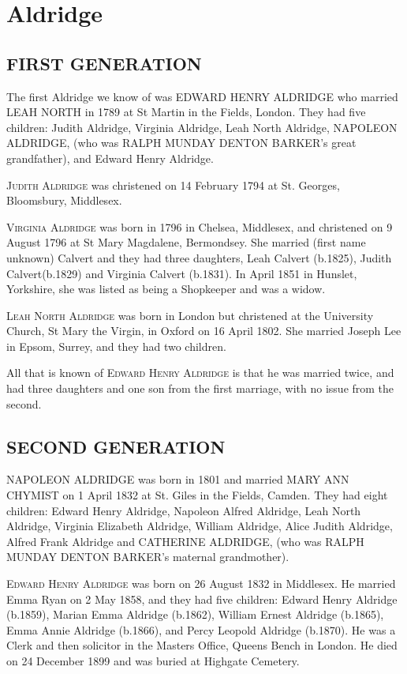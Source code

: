 \section{Aldridge}

\subsection{FIRST GENERATION}

The first Aldridge we know of was \uppercase{Edward Henry Aldridge} who married \uppercase{Leah North} in 1789 at St Martin in the Fields, London. They had five children: Judith Aldridge, Virginia Aldridge, Leah North Aldridge, \uppercase{Napoleon Aldridge}, (who was \uppercase{Ralph Munday Denton Barker}'s great grandfather), and Edward Henry Aldridge. 

\textsc{Judith Aldridge} was christened on 14 February 1794 at St. Georges,	Bloomsbury, Middlesex.

\textsc{Virginia Aldridge} was born in 1796 in Chelsea, Middlesex, and christened on 9 August 1796 at St Mary Magdalene,  	Bermondsey. She married  (first name unknown) Calvert and they had three daughters, Leah Calvert (b.1825), Judith Calvert(b.1829) and Virginia Calvert (b.1831). In April 1851 in	Hunslet, Yorkshire, she was listed as being a Shopkeeper and was a widow.

\textsc{Leah North Aldridge} was born in London but christened at the University Church, St Mary the Virgin, in Oxford on 16 April 1802. She married Joseph Lee in Epsom, Surrey, and they had two children.

All that is known of \textsc{Edward Henry Aldridge} is that he was married twice, and had three daughters and one son from the first marriage,  with no issue from the second. 

\subsection{SECOND GENERATION}

\uppercase{Napoleon Aldridge} was born in 1801 and married \uppercase{Mary Ann Chymist} on 1 April 1832 at St. Giles in the Fields, Camden.  They had eight children: Edward Henry Aldridge, Napoleon Alfred Aldridge, Leah North Aldridge, Virginia Elizabeth Aldridge, William Aldridge, Alice Judith Aldridge, Alfred Frank Aldridge and \uppercase{Catherine Aldridge}, (who was \uppercase{Ralph Munday Denton Barker}'s maternal grandmother).

\textsc{Edward Henry Aldridge} was born on 26 August 1832 in Middlesex. He married Emma Ryan on 2 May 1858, and they had five children: Edward Henry Aldridge (b.1859), Marian Emma Aldridge (b.1862), William Ernest Aldridge (b.1865), Emma Annie Aldridge (b.1866), and Percy Leopold Aldridge (b.1870). He was a Clerk and then solicitor in the Masters Office, Queens Bench in London. He died on 24 December 1899 and was buried at Highgate Cemetery.

